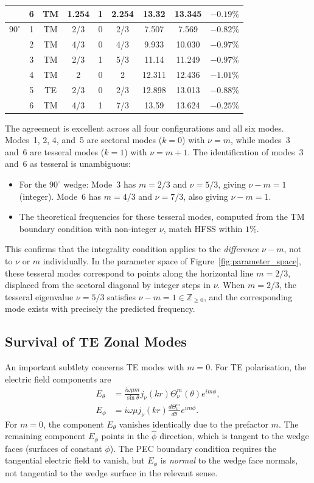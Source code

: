 \documentclass[
  aip,
  amsmath,amssymb,
  preprint
]{revtex4-1}
\begin{document}
\begin{table}[htbp]
\begin{tabular}{ccccccccc}
& 6 & TM & 1.254 & 1 & 2.254 & 13.32 & 13.345 & $-0.19\%$ \\
\hline
{$90^\circ$} 
& 1 & TM & 2/3 & 0 & 2/3 & 7.507 & 7.569 & $-0.82\%$ \\
& 2 & TM & 4/3 & 0 & 4/3 & 9.933 & 10.030 & $-0.97\%$ \\
& 3 & TM & 2/3 & 1 & 5/3 & 11.14 & 11.249 & $-0.97\%$ \\
& 4 & TM & 2 & 0 & 2 & 12.311 & 12.436 & $-1.01\%$ \\
& 5 & TE & 2/3 & 0 & 2/3 & 12.898 & 13.013 & $-0.88\%$ \\
& 6 & TM & 4/3 & 1 & 7/3 & 13.59 & 13.624 & $-0.25\%$ \\
\hline
\end{tabular}
\end{table}
The agreement is excellent across all four configurations and all six modes. Modes~1, 2, 4, and~5 are sectoral modes ($k = 0$) with $\nu = m$, while modes~3 and~6 are tesseral modes ($k = 1$) with $\nu = m + 1$. The identification of modes~3 and~6 as tesseral is unambiguous:
\begin{itemize}
\item For the $90^\circ$ wedge: Mode~3 has $m = 2/3$ and $\nu = 5/3$, giving $\nu - m = 1$ (integer). Mode~6 has $m = 4/3$ and $\nu = 7/3$, also giving $\nu - m = 1$.
\item The theoretical frequencies for these tesseral modes, computed from the TM boundary condition with non-integer $\nu$, match HFSS within $1\%$.
\end{itemize}
This confirms that the integrality condition applies to the \emph{difference} $\nu - m$, not to $\nu$ or $m$ individually. In the parameter space of Figure~\ref{fig:parameter_space}, these 
tesseral modes correspond to points along the horizontal line 
$m = 2/3$, displaced from the sectoral diagonal by integer steps 
in $\nu$. When $m = 2/3$, the tesseral eigenvalue $\nu = 5/3$ satisfies $\nu - m = 1 \in \mathbb{Z}_{\geq 0}$, and the corresponding mode exists with precisely the predicted frequency.

\subsection{Survival of TE Zonal Modes}
\label{subsec:TE_zonal}

An important subtlety concerns TE modes with $m = 0$. For TE polarisation, the electric field components are
\begin{align}
E_\theta &= \frac{i\omega\mu m}{\sin\theta} j_\nu(kr) \Theta_\nu^m(\theta) e^{im\phi}, \\
E_\phi &= i\omega\mu j_\nu(kr) \frac{d\Theta_\nu^m}{d\theta} e^{im\phi}.
\end{align}
For $m = 0$, the component $E_\theta$ vanishes identically due to the prefactor $m$. The remaining component $E_\phi$ points in the $\hat{\phi}$ direction, which is tangent to the wedge faces (surfaces of constant $\phi$). The PEC boundary condition requires the tangential electric field to vanish, but $E_\phi$ is \emph{normal} to the wedge face normals, not tangential to the wedge surface in the relevant sense.
\end{document}
